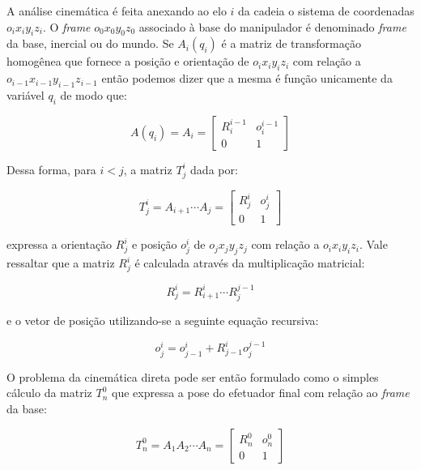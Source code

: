 A análise cinemática é feita anexando ao elo $i$ da cadeia o sistema de
coordenadas $o_i x_i y_i z_i$. O \emph{frame} $o_0 x_0 y_0 z_0$ associado à base do
manipulador é denominado \emph{frame} da base, inercial ou do mundo. Se
$A_i(q_i)$ é a matriz de transformação homogênea que fornece a posição e
orientação de $o_i x_i y_i z_i$ com relação a $o_{i-1} x_{i-1} y_{i-1} z_{i-1}$ então
podemos dizer que a mesma é função unicamente da variável $q_i$ de modo que:

\begin{equation}
    A(q_i) = A_i = \begin{bmatrix}
        R^{i-1}_i & o^{i-1}_i \\
        0         & 1
    \end{bmatrix}
\end{equation}

Dessa forma, para $i < j$, a matriz $T_j^i$ dada por:

\begin{equation}
    T_j^i = A_{i+1} \cdots A_j = \begin{bmatrix}
        R^i_j & o^i_j \\
        0     & 1
    \end{bmatrix}
\end{equation}

expressa a orientação $R^i_j$ e posição $o^i_j$ de $o_j x_j y_j z_j$ com relação a
$o_i x_i y_i z_i$. Vale ressaltar que a matriz $R^i_j$ é calculada através da
multiplicação matricial:

\begin{equation}
    R^i_j = R^i_{i+1} \cdots R^{j-1}_j
\end{equation}

e o vetor de posição utilizando-se a seguinte equação recursiva:

\begin{equation}
    o^i_j = o^i_{j-1} + R^i_{j-1}o^{j-1}_j
\end{equation}

O problema da cinemática direta pode ser então formulado como o simples cálculo
da matriz $T^0_n$ que expressa a pose do efetuador final com relação ao
\emph{frame} da base:

\begin{equation}\label{eq:fkine}
    T^0_n = A_1 A_2 \cdots A_n = \begin{bmatrix}
        R^0_n & o^0_n \\
        0     & 1
    \end{bmatrix}
\end{equation}

